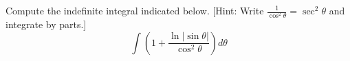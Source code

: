 \documentclass{ximera}
\begin{document}
\begin{question}%

Compute the indefinite integral indicated below. [Hint: Write \(\displaystyle \frac{1}{\cos^2 \theta} = \sec^2 \theta\) and integrate by parts.]
\[ \int \left( 1 + \frac{\ln | \sin \theta|}{\cos^2 \theta} \right) d \theta \]
\begin{multiplechoice}
\end{multiplechoice}

\end{question}
\end{document}
